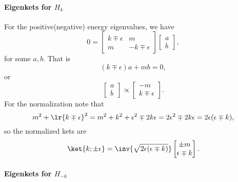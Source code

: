 \paragraph{Eigenkets for \( H_k \)}

For the positive(negative) energy eigenvalues, we have
%
\begin{dmath}\label{eqn:gradQuantumProblemSet4Problem3:140}
0
=
\begin{bmatrix}
k \mp \epsilon & m \\
m & -k \mp \epsilon
\end{bmatrix}
\begin{bmatrix}
a \\
b
\end{bmatrix},
\end{dmath}
%
for some \( a, b\).  That is
%
\begin{dmath}\label{eqn:gradQuantumProblemSet4Problem3:160}
(k \mp \epsilon) a + m b = 0,
\end{dmath}
%
or
%
\begin{dmath}\label{eqn:gradQuantumProblemSet4Problem3:180}
\begin{bmatrix}
a \\
b
\end{bmatrix}
\propto
\begin{bmatrix}
- m \\
k \mp \epsilon
\end{bmatrix}.
\end{dmath}
%
For the normalization note that
%
\begin{dmath}\label{eqn:gradQuantumProblemSet4Problem3:200}
m^2 + \lr{ k \mp \epsilon }^2
=
m^2 + k^2 + \epsilon^2 \mp 2 k \epsilon
=
2 \epsilon^2 \mp 2 k \epsilon
=
2 \epsilon (\epsilon \mp k),
\end{dmath}
%
so the normalized kets are
%
\begin{dmath}\label{eqn:gradQuantumProblemSet4Problem3:220}
\ket{k; \pm\epsilon} =
\inv{\sqrt{2 \epsilon(\epsilon \mp k)}}
\begin{bmatrix}
\pm m \\
\epsilon \mp k
\end{bmatrix}.
\end{dmath}
%
\paragraph{Eigenkets for \( H_{-k} \)}


